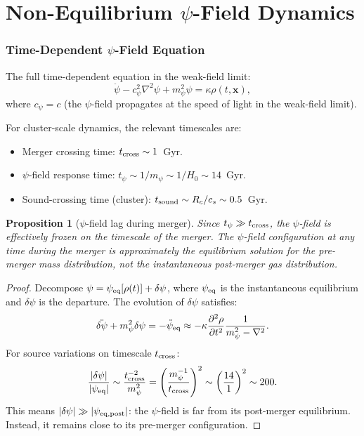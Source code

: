 \documentclass[11pt,a4paper]{article}
\newtheorem{proposition}[theorem]{Proposition}
\theoremstyle{remark}
\begin{document}
\part{Non-Equilibrium $\psi$-Field Dynamics}
\label{part:non-equilibrium}

\section{Time-Dependent $\psi$-Field Equation}

The full time-dependent equation in the weak-field limit:
\begin{equation}
\ddot\psi - c_\psi^2\nabla^2\psi + m_\psi^2\psi = \kappa\rho(t, \mathbf{x}),
\label{eq:psi-timedep}
\end{equation}
where $c_\psi = c$ (the $\psi$-field propagates at the speed of light
in the weak-field limit).

For cluster-scale dynamics, the relevant timescales are:
\begin{itemize}
\item Merger crossing time: $t_{\rm cross} \sim 1$~Gyr.
\item $\psi$-field response time: $t_\psi \sim 1/m_\psi \sim 1/H_0 \sim 14$~Gyr.
\item Sound-crossing time (cluster): $t_{\rm sound} \sim R_c/c_s \sim 0.5$~Gyr.
\end{itemize}

\begin{proposition}[$\psi$-field lag during merger]
\label{prop:psi-lag}
Since $t_\psi \gg t_{\rm cross}$, the $\psi$-field is effectively frozen
on the timescale of the merger. The $\psi$-field configuration at any
time during the merger is approximately the equilibrium solution for
the \emph{pre-merger} mass distribution, not the instantaneous post-merger
gas distribution.
\end{proposition}

\begin{proof}
Decompose $\psi = \psi_{\rm eq}[\rho(t)] + \delta\psi$, where $\psi_{\rm eq}$
is the instantaneous equilibrium and $\delta\psi$ is the departure.
The evolution of $\delta\psi$ satisfies:
\begin{equation}
\ddot{\delta\psi} + m_\psi^2\delta\psi = -\ddot\psi_{\rm eq}
\approx -\kappa\frac{\partial^2\rho}{\partial t^2}\frac{1}{m_\psi^2 - \nabla^2}.
\end{equation}
For source variations on timescale $t_{\rm cross}$:
\begin{equation}
\frac{|\delta\psi|}{|\psi_{\rm eq}|} \sim \frac{t_{\rm cross}^{-2}}{m_\psi^2}
= \left(\frac{m_\psi^{-1}}{t_{\rm cross}}\right)^2 \sim \left(\frac{14}{1}\right)^2 \sim 200.
\end{equation}
This means $|\delta\psi| \gg |\psi_{\rm eq, post}|$: the $\psi$-field
is far from its post-merger equilibrium. Instead, it remains close to its
pre-merger configuration.
\end{proof}
\end{document}
